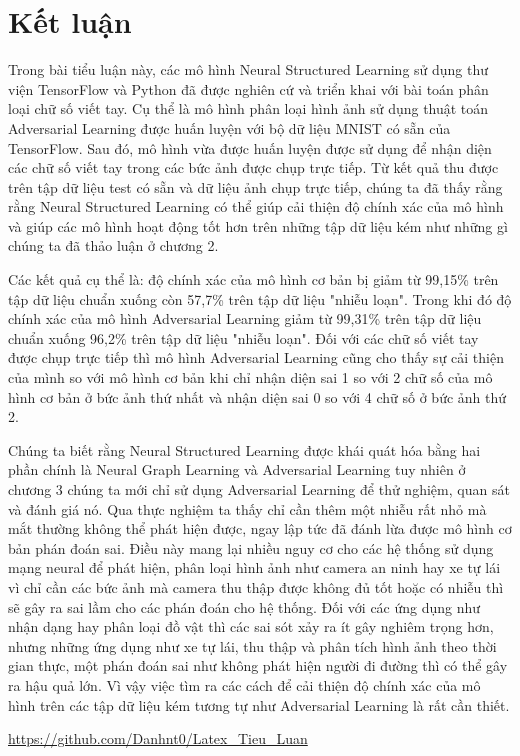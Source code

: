 
\chapter*{Kết luận} %

\label{Chapter4} %

Trong bài tiểu luận này, các mô hình Neural Structured Learning sử dụng thư viện TensorFlow và Python đã được nghiên cứ và triển khai với bài toán phân loại chữ số viết tay.
Cụ thể là mô hình phân loại hình ảnh sử dụng thuật toán Adversarial Learning được huấn luyện với bộ dữ liệu MNIST có sẵn của TensorFlow. Sau đó, mô hình vừa được huấn
luyện được sử dụng để nhận diện các chữ số viết tay trong các bức ảnh được chụp trực tiếp. Từ kết quả thu được trên tập dữ liệu test có sẵn và dữ liệu ảnh chụp trực tiếp, chúng ta đã thấy rằng
rằng Neural Structured Learning có thể giúp cải thiện độ chính xác của mô hình và giúp các mô hình hoạt động tốt hơn trên những tập dữ liệu kém như những gì chúng ta đã thảo luận ở chương 2.

Các kết quả cụ thể là: độ chính xác của mô hình cơ bản bị giảm từ 99,15\% trên tập dữ liệu chuẩn xuống còn 57,7\% trên tập dữ liệu "nhiễu loạn". Trong khi đó độ chính xác của mô hình Adversarial Learning
giảm từ 99,31\% trên tập dữ liệu chuẩn xuống 96,2\% trên tập dữ liệu "nhiễu loạn". 
Đối với các chữ số viết tay được chụp trực tiếp thì mô hình Adversarial Learning cũng cho thấy sự cải thiện của mình so với mô hình cơ bản khi chỉ nhận diện sai 1 so với 2 chữ số của mô hình cơ bản ở bức ảnh thứ nhất và nhận diện 
sai 0 so với 4 chữ số ở bức ảnh thứ 2.

Chúng ta biết rằng Neural Structured Learning được khái quát hóa bằng hai phần chính là Neural Graph Learning và
Adversarial Learning tuy nhiên ở chương 3 chúng ta mới chỉ sử dụng Adversarial Learning để thử nghiệm, quan sát và đánh giá nó.
Qua thực nghiệm ta thấy chỉ cần thêm một nhiễu rất nhỏ mà mắt thường không thể phát hiện được, ngay lập tức đã đánh lừa được mô hình cơ bản phán đoán sai.
Điều này mang lại nhiều nguy cơ cho các hệ thống sử dụng mạng neural để phát hiện, phân loại hình ảnh như camera an ninh hay xe tự lái vì chỉ cần các bức ảnh mà camera
thu thập được không đủ tốt hoặc có nhiễu thì sẽ gây ra sai lầm cho các phán đoán cho hệ thống. Đối với các ứng dụng như nhận dạng hay phân loại đồ vật thì các sai sót xảy ra ít gây nghiêm trọng hơn, nhưng những ứng dụng như xe tự
lái, thu thập và phân tích hình ảnh theo thời gian thực, một phán đoán sai như không phát hiện người đi đường thì có thể gây ra hậu quả lớn. 
Vì vậy việc tìm ra các cách để cải thiện độ chính xác của mô hình trên các tập dữ liệu kém tương tự như Adversarial Learning là rất cần thiết.


\url{https://github.com/Danhnt0/Latex_Tieu_Luan}